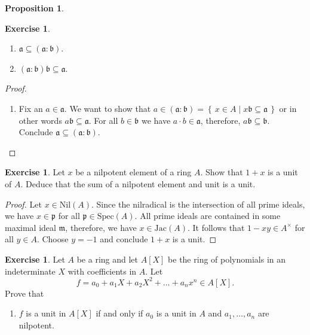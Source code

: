 \documentclass{book}
\theoremstyle{plain}
\newtheorem{prps}{Proposition}
\theoremstyle{definition}
\newtheorem{exr}[thm]{Exercise}
\theoremstyle{custom_definition}
\newcommand{\makeset}[2]{\left\{\, #1 \mid #2 \,\right\}}
\begin{document}
\begin{prps}

\end{prps}

\begin{exr}
    \begin{enumerate}
        \item \(\mathfrak{a} \subseteq (\mathfrak{a} : \mathfrak{b})\).
        \item \((\mathfrak{a} : \mathfrak{b}) \mathfrak{b} \subseteq \mathfrak{a}\).
    \end{enumerate}
\end{exr}

\begin{proof}
    \begin{enumerate}
        \item Fix an \(a \in \mathfrak{a}\). We want to show that \(a \in (\mathfrak{a} : \mathfrak{b}) = \makeset{x \in A}{x \mathfrak{b} \subseteq \mathfrak{a}}\) or in other words \(a \mathfrak{b} \subseteq \mathfrak{a}\). For all \(b \in \mathfrak{b}\) we have \(a \cdot b \in \mathfrak{a}\), therefore, \(a \mathfrak{b} \subseteq \mathfrak{b}\). Conclude \(\mathfrak{a} \subseteq (\mathfrak{a} : \mathfrak{b})\).
    \end{enumerate}
\end{proof}

\begin{exr}
    Let \(x\) be a nilpotent element of a ring \(A\). Show that \(1 + x\) is a unit of \(A\). Deduce that the sum of a nilpotent element and unit is a unit.
\end{exr}

\begin{proof}
    Let \(x \in \text{Nil}(A)\). Since the nilradical is the intersection of all prime ideals, we have \(x \in \mathfrak{p}\) for all \(\mathfrak{p} \in \text{Spec}(A)\). All prime ideals are contained in some maximal ideal \(\mathfrak{m}\), therefore, we have \(x \in \text{Jac}(A)\). It follows that \(1 - xy \in A^\times\) for all \(y \in A\). Choose \(y = -1\) and conclude \(1 + x\) is a unit.
\end{proof}

\begin{exr}
    Let \(A\) be a ring and let \(A[X]\) be the ring of polynomials in an indeterminate \(X\) with coefficients in \(A\). Let
    \begin{equation}
        f = a_0 + a_1 X + a_2 X^2 + \ldots + a_n x^n \in A[X] \text{.}
    \end{equation}
    Prove that
    \begin{enumerate}
        \item \(f\) is a unit in \(A[X]\) if and only if \(a_0\) is a unit in \(A\) and \(a_1, \ldots, a_n\) are nilpotent.
    \end{enumerate}
\end{exr}
\end{document}
